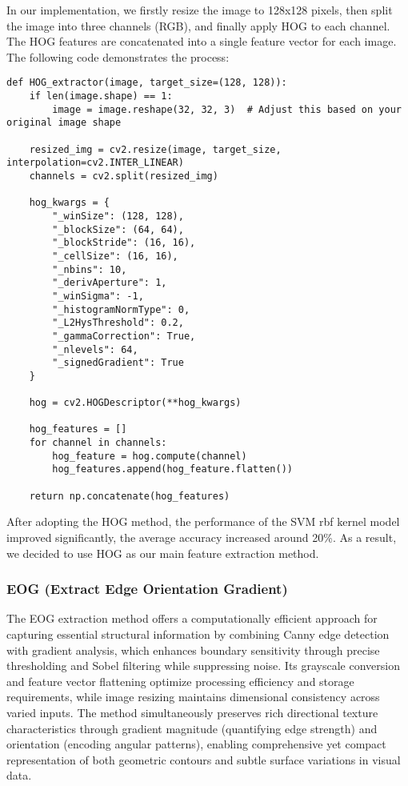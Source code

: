 \documentclass[a4paper,11pt]{article}
\begin{document}
In our implementation, we firstly resize the image to 128x128 pixels, then split the image into three channels (RGB), and finally apply HOG to each channel. The HOG features are concatenated into a single feature vector for each image. The following code demonstrates the process:

\begin{verbatim}
def HOG_extractor(image, target_size=(128, 128)):
    if len(image.shape) == 1:
        image = image.reshape(32, 32, 3)  # Adjust this based on your original image shape

    resized_img = cv2.resize(image, target_size, interpolation=cv2.INTER_LINEAR)
    channels = cv2.split(resized_img)
    
    hog_kwargs = {
        "_winSize": (128, 128),
        "_blockSize": (64, 64),
        "_blockStride": (16, 16),
        "_cellSize": (16, 16),
        "_nbins": 10,
        "_derivAperture": 1,
        "_winSigma": -1,
        "_histogramNormType": 0,
        "_L2HysThreshold": 0.2,
        "_gammaCorrection": True,
        "_nlevels": 64,
        "_signedGradient": True
    }   

    hog = cv2.HOGDescriptor(**hog_kwargs)

    hog_features = []
    for channel in channels:
        hog_feature = hog.compute(channel)
        hog_features.append(hog_feature.flatten())

    return np.concatenate(hog_features)
\end{verbatim}

After adopting the HOG method, the performance of the SVM rbf kernel model improved significantly, the average accuracy increased around 20\%.
As a result, we decided to use HOG as our main feature extraction method.

\subsubsection{EOG (Extract Edge Orientation Gradient)}

The EOG extraction method offers a computationally efficient approach for capturing essential structural information by combining Canny edge detection with gradient analysis, which enhances boundary sensitivity through precise thresholding and Sobel filtering while suppressing noise. Its grayscale conversion and feature vector flattening optimize processing efficiency and storage requirements, while image resizing maintains dimensional consistency across varied inputs. The method simultaneously preserves rich directional texture characteristics through gradient magnitude (quantifying edge strength) and orientation (encoding angular patterns), enabling comprehensive yet compact representation of both geometric contours and subtle surface variations in visual data.
\end{document}

